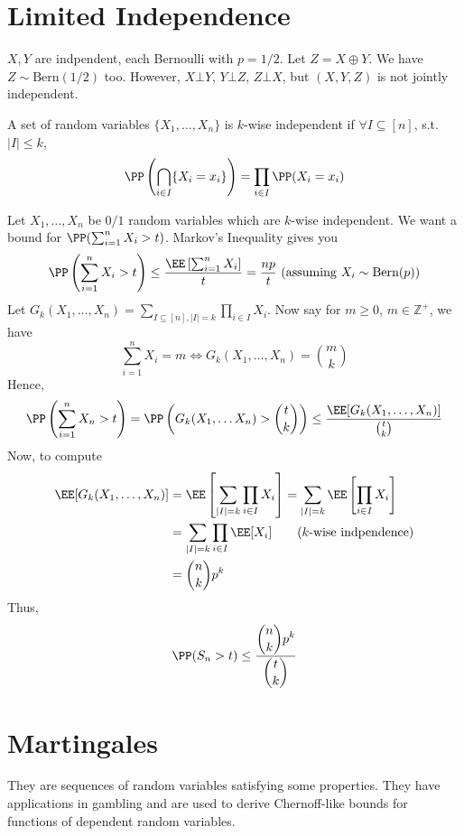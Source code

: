 \section{Limited Independence}
\begin{eg}
$X, Y$ are indpendent, each Bernoulli with $p = 1/2$. Let $Z = X \oplus Y$. We have $Z \sim \text{Bern}(1/2)$ too. However, $X \bot Y$, $Y \bot Z$, $Z \bot X$, but $(X,Y,Z)$ is not jointly independent.
\end{eg}
\begin{definition}
A set of random variables $\{X_1, \dots, X_n\}$ is $k$-wise independent if $\forall I \subseteq [n]$, s.t. $|I| \leq k$,
\begin{equation}
    \PP\left(\bigcap_{i \in I} \{X_i = x_i\}\right) = \prod_{i \in I} \PP(X_i = x_i)
\end{equation}
\end{definition}
Let $X_1, \dots, X_n$ be $0/1$ random variables which are $k$-wise independent. We want a bound for $\PP(\sum_{i=1}^n X_i > t)$. Markov's Inequality gives you
\[
\PP\left(\sum_{i=1}^n X_i > t\right) \leq \frac{\EE\left[\sum_{i=1}^n X_i\right]}{t} = \frac{np}{t} \text{ (assuming $X_i \sim \text{Bern}(p)$)}
\]
Let $G_k(X_1, \dots, X_n) = \sum_{I \subseteq [n], |I| = k}\prod_{i \in I} X_i$. Now say for $m \geq 0$, $m \in \mathbb{Z}^+$, we have
\[
\sum_{i=1}^n X_i = m \iff G_k(X_1, \dots, X_n) = \binom{m}{k}
\]
Hence,
\[
\PP\left(\sum_{i=1}^n X_n > t\right) = \PP\left(G_k(X_1, \dots X_n) > \binom tk\right) \leq \frac{\EE[G_k(X_1, \dots, X_n)]}{\binom tk}
\]
Now, to compute
\begin{align*}
    \EE[G_k(X_1, \dots, X_n)] &= \EE\left[\sum_{|I|=k}\prod_{i\in I} X_i\right] = \sum_{|I| = k} \EE\left[\prod_{i\in I} X_i\right] \\
    &= \sum_{|I| = k} \prod_{i \in I} \EE[X_i] \qquad\text{({$k$-wise indpendence})} \\
    &= \binom nk p^k
\end{align*}
Thus, 
\[
\PP(S_n > t) \leq \frac{\displaystyle \binom nk p^k}{\displaystyle\binom tk}
\]
\section{Martingales}
They are sequences of random variables satisfying some properties. They have applications in gambling and are used to derive Chernoff-like bounds for functions of dependent random variables.